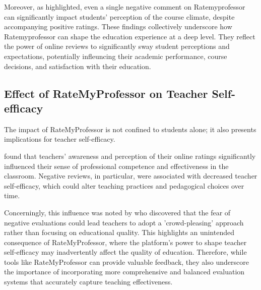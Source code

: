 \documentclass[doc, 12pt, twocolumn]{apa7}
\begin{document}
Moreover, as \textcite{scherr_single_2013} highlighted, even a single negative comment on Ratemyprofessor can significantly impact students' perception of the course climate, despite accompanying positive ratings. These findings collectively underscore how Ratemyprofessor can shape the education experience at a deep level. They reflect the power of online reviews to significantly sway student perceptions and expectations, potentially infleuncing their academic performance, course decisions, and satisfaction with their education.


\subsection{Effect of RateMyProfessor on Teacher Self-efficacy}
The impact of RateMyProfessor is not confined to students alone; it also presents implications for teacher self-efficacy. 



\textcite{smith_teacher_2018} found that teachers' awareness and perception of their online ratings significantly influenced their sense of professional competence and effectiveness in the classroom. Negative reviews, in particular, were associated with decreased teacher self-efficacy, which could alter teaching practices and pedagogical choices over time.

Concerningly, this influence was noted by \textcite{jones_pedagogical_2019} who discovered that the fear of negative evaluations could lead teachers to adopt a 'crowd-pleasing' approach rather than focusing on educational quality. This highlights an unintended consequence of RateMyProfessor, where the platform's power to shape teacher self-efficacy may inadvertently affect the quality of education. Therefore, while tools like RateMyProfessor can provide valuable feedback, they also underscore the importance of incorporating more comprehensive and balanced evaluation systems that accurately capture teaching effectiveness.









\printbibliography
\end{document}
